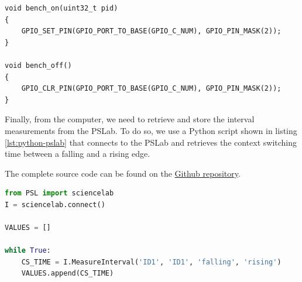 \begin{lstlisting}[style=CStyle, caption={\texttt{bench\_on()} and \texttt{bench\_off()} implementation in Contiki}, label={lst:external-on-off-code}]
void bench_on(uint32_t pid)
{
    GPIO_SET_PIN(GPIO_PORT_TO_BASE(GPIO_C_NUM), GPIO_PIN_MASK(2));
}

void bench_off()
{
    GPIO_CLR_PIN(GPIO_PORT_TO_BASE(GPIO_C_NUM), GPIO_PIN_MASK(2));
}
\end{lstlisting}

Finally, from the computer, we need to retrieve and store the interval measurements from the PSLab.
To do so, we use a Python script shown in listing \ref{lst:python-pslab} that connects to the PSLab and retrieves the context switching time between a falling and a rising edge.

The complete source code can be found on the \href{https://github.com/bench-os/bench-os}{Github repository}.

\begin{lstlisting}[style=CStyle, language=python, caption={Python script to communicate with the PSLab and retrieve the interval measurements}, label={lst:python-pslab}]
from PSL import sciencelab
I = sciencelab.connect()

VALUES = []

while True:
    CS_TIME = I.MeasureInterval('ID1', 'ID1', 'falling', 'rising')
    VALUES.append(CS_TIME)
\end{lstlisting}